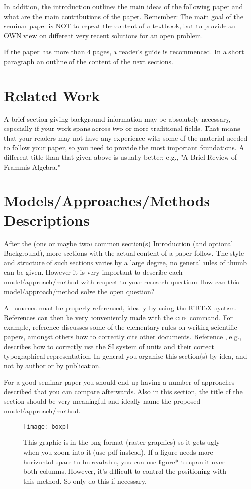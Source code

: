 \documentclass[conference]{IEEEtran}  %
\theoremstyle{plain}
\theoremstyle{definition}
\theoremstyle{remark}
\begin{document}
In addition, the introduction outlines the main ideas of the following paper and what are the main contributions of the paper. Remember: The main goal of the seminar paper is NOT to repeat the content of a textbook, but to provide an OWN view on different very recent solutions for an open problem.

If the paper has more than 4 pages, a reader's guide is recommenced. In a short paragraph an outline of the content of the next sections.

\section{Related Work}
\label{sec:basics}
A brief section giving background information may be absolutely necessary, especially if your work spans across two or more traditional fields. That means that your readers may not have any experience with some of the material needed to follow your paper, so you need to provide the most important foundations. A different title than that given above is usually better; e.g., "A Brief Review of Frammis Algebra."


\section{Models/Approaches/Methods Descriptions}
\label{sec:model}

After the (one or maybe two) common section(s) Introduction (and optional Background), more sections with the actual content of a paper follow. The style and structure of such sections varies by a large degree, no general rules of thumb can be given. However it is very important to describe each model/approach/method with respect to your research question: How can this model/approach/method solve the open question? 

All sources must be properly referenced, ideally by using the BiBTeX system. References can then be very conveniently made with the \textsc{cite} command. For example, reference
\cite{Leunen:Scholars:92} discusses some of the elementary rules on writing scientific papers, amongst others how to correctly cite other documents. Reference \cite{Taylor:SIGuide:95}, e.g., describes how to correctly use the SI system of units and their correct typographical
representation. In general you organise this section(s) by idea, and not by author or by publication.

For a good seminar paper you should end up having a number of approaches described that you can compare afterwards. Also in this section, the title of the section should be very meaningful and ideally name the proposed model/approach/method.
\begin{figure*}
	 \centerline{\texttt{[image: boxp]}}
	 {\caption{This graphic is in the png format (raster graphics) so it gets ugly when you zoom into it (use pdf instead). If a figure needs more horizontal space to be readable, you can use figure* to span it over both columns. However, it's difficult to control the positioning with this method. So only do this if necessary.}\label{fig:1colfig}}
\end{figure*}
\end{document}
